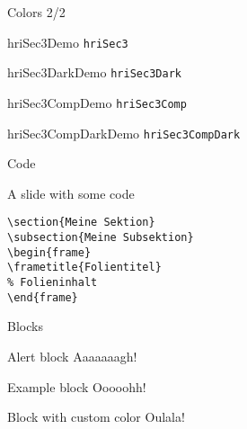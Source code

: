 \documentclass[compress]{beamer}
\begin{document}
\begin{frame}{Colors 2/2}
\begin{multicols}{2}
\begin{beamercolorbox}[wd=\linewidth,ht=2ex,leftskip=.5ex,dp=0.7ex]{hriSec3Demo}
	\texttt{hriSec3}
\end{beamercolorbox}
\begin{beamercolorbox}[wd=\linewidth,ht=2ex,leftskip=.5ex,dp=0.7ex]{hriSec3DarkDemo}
	\texttt{hriSec3Dark}
\end{beamercolorbox}
\begin{beamercolorbox}[wd=\linewidth,ht=2ex,leftskip=.5ex,dp=0.7ex]{hriSec3CompDemo}
	\texttt{hriSec3Comp}
\end{beamercolorbox}
\begin{beamercolorbox}[wd=\linewidth,ht=2ex,leftskip=.5ex,dp=0.7ex]{hriSec3CompDarkDemo}
	\texttt{hriSec3CompDark}
\end{beamercolorbox}

\end{multicols}
\end{frame}

\begin{frame}[containsverbatim]{Code}

A slide with some code

\begin{lstlisting}
\section{Meine Sektion}
\subsection{Meine Subsektion}
\begin{frame}
\frametitle{Folientitel}
% Folieninhalt
\end{frame}
\end{lstlisting}
\end{frame}


\begin{frame}[containsverbatim]{Blocks}
\begin{alertblock}{Alert block}
	Aaaaaaagh!
\end{alertblock}

\begin{exampleblock}{Example block}
    Ooooohh!
\end{exampleblock}

\begingroup
{}
\begin{block}{Block with custom color}
    Oulala!
\end{block}
\endgroup
\end{frame}
\end{document}
